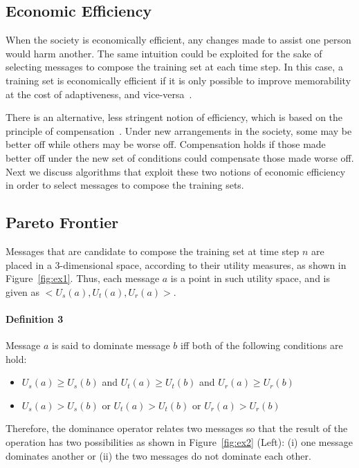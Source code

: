 \documentclass{sig-alternate}
\begin{document}
\subsection{Economic Efficiency}

When the society is economically efficient, any changes made to assist one person would harm another. The same intuition could be exploited for the sake of selecting messages to compose the training set at each time step. In this case, a training set is economically efficient if it is only possible to improve memorability at the cost of adaptiveness, and vice-versa~\cite{recsys12,icmr14}.

There is an alternative, less stringent notion of efficiency, which is based on the principle of compensation~\cite{compensation}.
Under new arrangements in the society, some may be better off while others may be worse off.
Compensation holds if those made better off
under the new set of conditions could compensate those made worse off. Next we discuss algorithms that exploit these two notions of economic efficiency in order to select messages to compose the training sets.

\subsection*{Pareto Frontier}
Messages that are candidate to compose the training set at time step $n$ are placed in a 3-dimensional space, according to their utility measures, as shown in Figure~\ref{fig:ex1}.
Thus, each message $a$ is a point in such utility space, and is given as $<U_s(a),U_t(a),U_r(a)>$.

\paragraph*{\bf{Definition 3}} Message $a$ is said to dominate message $b$ iff both of the following conditions are hold:
\begin{itemize}
\item $U_s(a)\ge U_s(b)$ and $U_t(a)\ge U_t(b)$ and $U_r(a)\ge U_r(b)$
\item $U_s(a) > U_s(b)$ or $U_t(a) > U_t(b)$ or $U_r(a) > U_r(b)$
\end{itemize}
Therefore, the dominance operator relates two messages so that the result of the
operation has two possibilities as shown in Figure~\ref{fig:ex2} (Left): (i) one message dominates another or (ii) the two
messages do not dominate each other.
\end{document}
